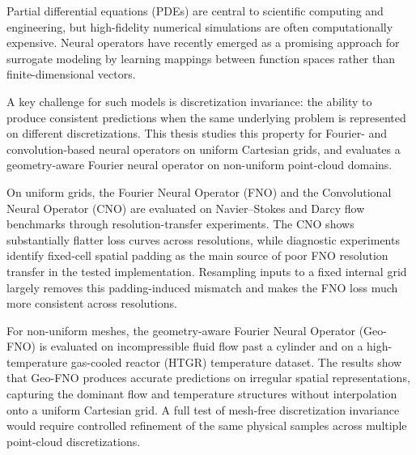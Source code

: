 Partial differential equations (PDEs) are central to scientific computing and engineering, but high-fidelity numerical simulations are often computationally expensive. Neural operators have recently emerged as a promising approach for surrogate modeling by learning mappings between function spaces rather than finite-dimensional vectors.

A key challenge for such models is discretization invariance: the ability to produce consistent predictions when the same underlying problem is represented on different discretizations. This thesis studies this property for Fourier- and convolution-based neural operators on uniform Cartesian grids, and evaluates a geometry-aware Fourier neural operator on non-uniform point-cloud domains.

On uniform grids, the Fourier Neural Operator (FNO) and the Convolutional Neural Operator (CNO) are evaluated on Navier--Stokes and Darcy flow benchmarks through resolution-transfer experiments. The CNO shows substantially flatter loss curves across resolutions, while diagnostic experiments identify fixed-cell spatial padding as the main source of poor FNO resolution transfer in the tested implementation. Resampling inputs to a fixed internal grid largely removes this padding-induced mismatch and makes the FNO loss much more consistent across resolutions.

For non-uniform meshes, the geometry-aware Fourier Neural Operator (Geo-FNO) is evaluated on incompressible fluid flow past a cylinder and on a high-temperature gas-cooled reactor (HTGR) temperature dataset. The results show that Geo-FNO produces accurate predictions on irregular spatial representations, capturing the dominant flow and temperature structures without interpolation onto a uniform Cartesian grid. A full test of mesh-free discretization invariance would require controlled refinement of the same physical samples across multiple point-cloud discretizations.